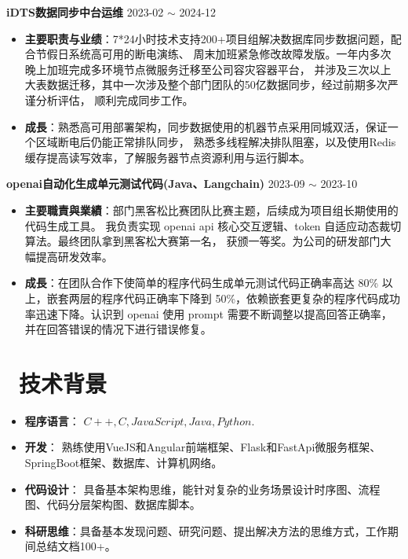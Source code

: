 \documentclass[10pt, a4paper]{article}
\begin{document}
\textbf{ iDTS数据同步中台运维} \hfill 2023-02 $\sim$ 2024-12

\begin{itemize}[parsep=0.5ex]
\item \textbf{主要职责与业绩}：7*24小时技术支持200+项目组解决数据库同步数据问题，配合节假日系统高可用的断电演练、
周末加班紧急修改故障发版。一年内多次晚上加班完成多环境节点微服务迁移至公司容灾容器平台，
并涉及三次以上大表数据迁移，其中一次涉及整个部门团队的50亿数据同步，经过前期多次严谨分析评估，
顺利完成同步工作。

\item \textbf{成長}：熟悉高可用部署架构，同步数据使用的机器节点采用同城双活，保证一个区域断电后仍能正常排队同步，
熟悉多线程解决排队阻塞，以及使用Redis缓存提高读写效率，了解服务器节点资源利用与运行脚本。
\end{itemize}

\textbf{openai自动化生成单元测试代码(Java、Langchain)} \hfill 2023-09 $\sim$ 2023-10

\begin{itemize}[parsep=0.5ex]
\item \textbf{主要職責與業績}：部门黑客松比赛团队比赛主题，后续成为项目组长期使用的代码生成工具。
我负责实现 openai api 核心交互逻辑、token 自适应动态裁切算法。最终团队拿到黑客松大赛第一名，
获颁一等奖。为公司的研发部门大幅提高研发效率。

\item \textbf{成長}：在团队合作下使简单的程序代码生成单元测试代码正确率高达 80\% 以上，嵌套两层的程序代码正确率下降到 50\%，依赖嵌套更复杂的程序代码成功率迅速下降。认识到 openai 使用 prompt 需要不断调整以提高回答正确率，并在回答错误的情况下进行错误修复。
\end{itemize}

\section{\color{CVBlue}\faCogs\ 技术背景}
\begin{itemize}[parsep=0.5ex]
  \item \textbf{程序语言}： $C++, C, JavaScript, Java, Python$.
  \item \textbf{开发}： 熟练使用VueJS和Angular前端框架、Flask和FastApi微服务框架、SpringBoot框架、数据库、计算机网络。
  \item \textbf{代码设计}： 具备基本架构思维，能针对复杂的业务场景设计时序图、流程图、代码分层架构图、数据库脚本。
  \item \textbf{科研思维}：具备基本发现问题、研究问题、提出解决方法的思维方式，工作期间总结文档100+。
\end{itemize}
\end{document}
